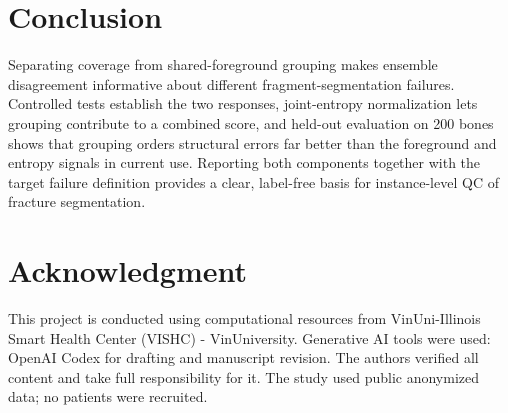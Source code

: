 \documentclass[conference]{IEEEtran}
\begin{document}
\section{Conclusion}
Separating coverage from shared-foreground grouping makes ensemble disagreement informative about different fragment-segmentation failures. Controlled tests establish the two responses, joint-entropy normalization lets grouping contribute to a combined score, and held-out evaluation on 200 bones shows that grouping orders structural errors far better than the foreground and entropy signals in current use. Reporting both components together with the target failure definition provides a clear, label-free basis for instance-level QC of fracture segmentation.

\section*{Acknowledgment}
This project is conducted using computational resources from VinUni-Illinois Smart Health Center (VISHC) - VinUniversity. Generative AI tools were used: OpenAI Codex for drafting and manuscript revision. The authors verified all content and take full responsibility for it. The study used public anonymized data; no patients were recruited.



\end{document}
